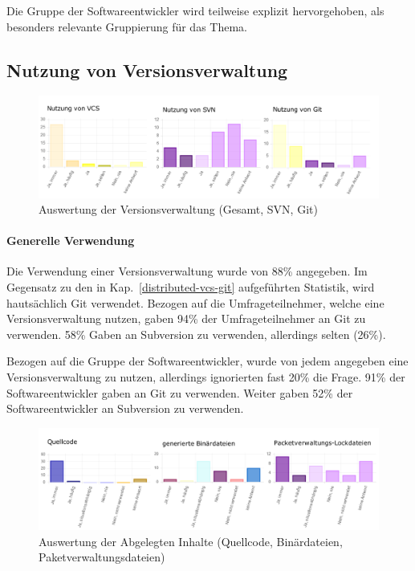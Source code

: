Die Gruppe der Softwareentwickler wird teilweise explizit hervorgehoben, als besonders relevante Gruppierung für das Thema.

\subsection{Nutzung von Versionsverwaltung}

\begin{figure}[htbp]
  \includegraphics[width=\textwidth, height=\textheight, keepaspectratio]
    {resources/survey-vcs-usage.pdf}
  \caption{Auswertung der Versionsverwaltung (Gesamt, SVN, Git)}
\end{figure}

\paragraph{Generelle Verwendung}

Die Verwendung einer Versionsverwaltung wurde von 88\% angegeben. Im Gegensatz zu den in  Kap.~\ref{distributed-vcs-git} aufgeführten Statistik, wird hautsächlich Git verwendet. Bezogen auf die Umfrageteilnehmer, welche eine Versionsverwaltung nutzen, gaben 94\% der Umfrageteilnehmer an Git zu verwenden. 58\% Gaben an Subversion zu verwenden, allerdings selten (26\%). 

Bezogen auf die Gruppe der Softwareentwickler, wurde von jedem angegeben eine Versionsverwaltung zu nutzen, allerdings ignorierten fast 20\% die Frage. 91\% der Softwareentwickler gaben an Git zu verwenden. Weiter gaben 52\% der Softwareentwickler an Subversion zu verwenden.

\begin{figure}[htbp]
  \includegraphics[width=\textwidth, height=\textheight, keepaspectratio]
    {resources/survey-vcs-content.pdf}
  \caption{Auswertung der Abgelegten Inhalte (Quellcode, Binärdateien, Paketverwaltungsdateien)}
\end{figure}

